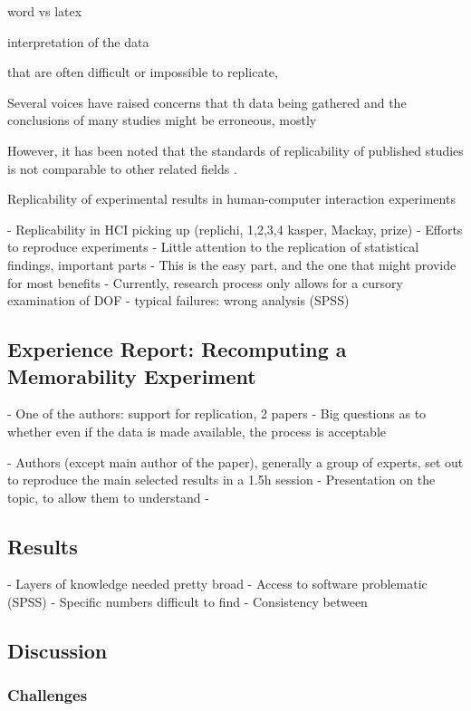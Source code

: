 word vs latex

 interpretation of the data 

 that are often difficult or impossible to replicate, 

Several voices have raised concerns that th data being gathered and the conclusions of many studies might be erroneous, mostly

However, it has been noted that the standards of replicability of published studies is not comparable to other related fields \cite{hornbaek,wilson1}. 

Replicability of experimental results in human-computer interaction experiments


- Replicability in HCI picking up (replichi, 1,2,3,4 kasper, Mackay, prize) 
- Efforts to reproduce experiments
- Little attention to the replication of statistical findings, important parts
- This is the easy part, and the one that might provide for most benefits
- Currently, research process only allows for a cursory examination of DOF
	- typical failures: wrong analysis (SPSS)

\subsection{Experience Report: Recomputing a Memorability Experiment}
- One of the authors: support for replication, 2 papers
- Big questions as to whether even if the data is made available, the process is acceptable

- Authors (except main author of the paper), generally a group of experts, set out to reproduce the main selected results in a 1.5h session
- Presentation on the topic, to allow them to understand
- 

\subsection{Results}
- Layers of knowledge needed pretty broad
- Access to software problematic (SPSS)
- Specific numbers difficult to find
- Consistency between 

\subsection{Discussion}

\subsubsection{Challenges}

